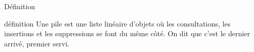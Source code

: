 \documentclass[10pt,xcolor=dvipsnames]{beamer}
\newcommand{\defin}[1]{\textcolor{darkspringgreen}{#1}}
\begin{document}
\begin{frame}{Définition}
    \begin{exampleblock}{définition}
Une \defin{pile} est une liste linéaire d'objets où les consultations, les insertions et les suppressions se font du même côté. On dit que c'est le \defin{dernier arrivé, premier servi}.
\end{exampleblock}




\end{frame}
\end{document}
